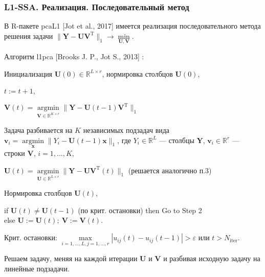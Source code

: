 \documentclass[10pt, ucs, notheorems, handout]{beamer}
\DeclareMathOperator*{\argminB}{argmin}   %
\begin{document}
\begin{frame}
\frametitle{L1-SSA. Реализация. Последовательный метод}
\small{
В R-пакете pcaL1 [Jot et al., 2017] имеется реализация последовательного метода решения задачи $\|\mathbf{Y}-\mathbf{U}\mathbf{V}^{\mathrm{T}}\|_1 \longrightarrow \min\limits_{\mathbf{U},\mathbf{V}}.$ }%

\alert{Алгоритм l1pca} [Brooks J. P., Jot S., 2013] :\\
\small{
\begin{enumerate}
\item Инициализация $\mathbf{U}(0)\in \mathbb{R}^{L\times r}$, нормировка столбцов  $\mathbf{U}(0)$,
\item $t:=t+1$,
\item  $\mathbf{V}(t) = \argminB\limits_{\mathbf{V}\in \mathbb{R}^{K\times r}} \|\mathbf{Y}-\mathbf{U}(t-1)\mathbf{V}^{\mathrm{T}}\|_1$ 

\footnotesize{Задача разбивается на $K$ независимых подзадач вида $\mathbf{v}_i = \argminB\limits_{\mathbf{x}} \|Y_i-\mathbf{U}(t-1)\mathbf{x}\|_1$,
где $Y_i\in \mathbb{R}^L$ --- столбцы $\mathbf{Y}$, $\mathbf{v}_i\in\mathbb{R}^r$ --- строки $\mathbf{V}$, $i=1,\ldots,K$},
\small{
\item  $\mathbf{U}(t) = \argminB\limits_{\mathbf{U}\in \mathbb{R}^{L\times r}} \|\mathbf{Y}-\mathbf{U}\mathbf{V}^{\mathrm{T}}(t)\|_1$ (решается аналогично п.3)
\item Нормировка столбцов $\mathbf{U}(t)$,
\item  if $\mathbf{U}(t) \ne \mathbf{U}(t-1)$ (по крит. остановки) then Go to Step 2 \\
else $\mathbf{U}:=\mathbf{U}(t);~ \mathbf{V}:=\mathbf{V}(t)$.
}
\end{enumerate}
}
\small{
Крит. остановки: $\max \limits_{i=1,\ldots,L, j=1,\ldots,r} |u_{ij}(t) - u_{ij}(t-1)| > \varepsilon$ или $t>N_{\text{iter}}$.}

\normalsize{Решаем задачу, меняя на каждой итерации $\mathbf{U}$ и $\mathbf{V}$ и разбивая исходную задачу на линейные подзадачи.}
\end{frame}
\end{document}
